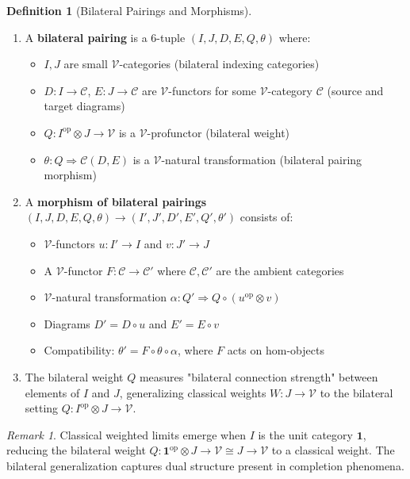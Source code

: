 \documentclass[11pt]{article}
\theoremstyle{plain}
\theoremstyle{definition}
\newtheorem{definition}[theorem]{Definition}
\theoremstyle{remark}
\newtheorem{remark}[theorem]{Remark}
\newcommand{\V}{\mathcal{V}}
\newcommand{\C}{\mathcal{C}}
\newcommand{\op}{\mathrm{op}}
\begin{document}
\begin{definition}[Bilateral Pairings and Morphisms]\label{def:bilateral-pairing}
\begin{enumerate}
\item A \textbf{bilateral pairing} is a 6-tuple $(I, J, D, E, Q, \theta)$ where:
\begin{itemize}
\item $I, J$ are small $\V$-categories (bilateral indexing categories)
\item $D : I \to \C$, $E : J \to \C$ are $\V$-functors for some $\V$-category $\C$ (source and target diagrams)
\item $Q : I^{\op} \otimes J \to \V$ is a $\V$-profunctor (bilateral weight)
\item $\theta : Q \Rightarrow \C(D, E)$ is a $\V$-natural transformation (bilateral pairing morphism)
\end{itemize}

\item A \textbf{morphism of bilateral pairings} $(I, J, D, E, Q, \theta) \to (I', J', D', E', Q', \theta')$ consists of:
\begin{itemize}
\item $\V$-functors $u : I' \to I$ and $v : J' \to J$
\item A $\V$-functor $F : \C \to \C'$ where $\C, \C'$ are the ambient categories
\item $\V$-natural transformation $\alpha : Q' \Rightarrow Q \circ (u^{\op} \otimes v)$
\item Diagrams $D' = D \circ u$ and $E' = E \circ v$
\item Compatibility: $\theta' = F \circ \theta \circ \alpha$, where $F$ acts on hom-objects
\end{itemize}

\item The bilateral weight $Q$ measures "bilateral connection strength" between elements of $I$ and $J$, generalizing classical weights $W : J \to \V$ to the bilateral setting $Q : I^{\op} \otimes J \to \V$.
\end{enumerate}
\end{definition}

\begin{remark}
Classical weighted limits emerge when $I$ is the unit category $\mathbf{1}$, reducing the bilateral weight $Q : \mathbf{1}^{\op} \otimes J \to \V \cong J \to \V$ to a classical weight. The bilateral generalization captures dual structure present in completion phenomena.
\end{remark}
\end{document}
